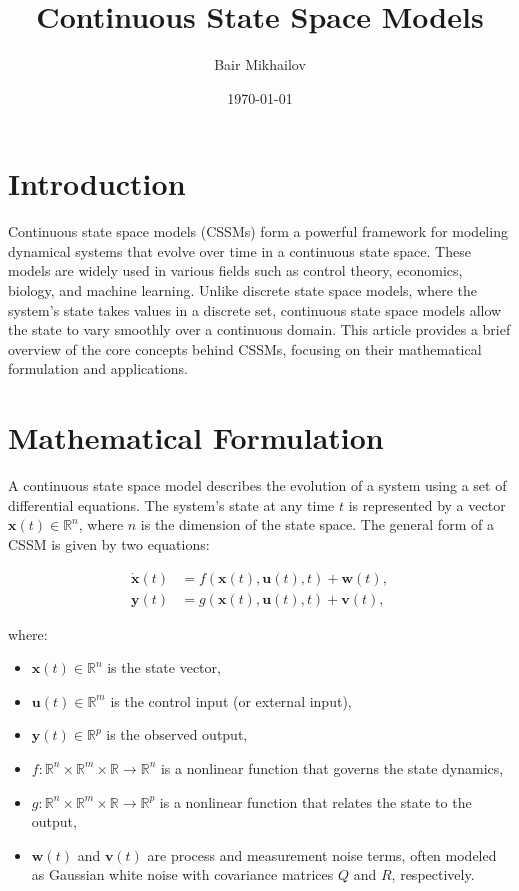 \documentclass[12pt]{article}
\title{Continuous State Space Models}
\author{Bair Mikhailov}
\date{\today}
\begin{document}
\maketitle

\section{Introduction}

Continuous state space models (CSSMs) form a powerful framework for modeling dynamical systems that evolve over time in a continuous state space. These models are widely used in various fields such as control theory, economics, biology, and machine learning. Unlike discrete state space models, where the system's state takes values in a discrete set, continuous state space models allow the state to vary smoothly over a continuous domain. This article provides a brief overview of the core concepts behind CSSMs, focusing on their mathematical formulation and applications.

\section{Mathematical Formulation}

A continuous state space model describes the evolution of a system using a set of differential equations. The system's state at any time \( t \) is represented by a vector \( \mathbf{x}(t) \in \mathbb{R}^n \), where \( n \) is the dimension of the state space. The general form of a CSSM is given by two equations:

\begin{align}
    \dot{\mathbf{x}}(t) &= f(\mathbf{x}(t), \mathbf{u}(t), t) + \mathbf{w}(t), \label{eq:state_equation}\\
    \mathbf{y}(t) &= g(\mathbf{x}(t), \mathbf{u}(t), t) + \mathbf{v}(t), \label{eq:output_equation}
\end{align}

where:
\begin{itemize}
    \item \( \mathbf{x}(t) \in \mathbb{R}^n \) is the state vector,
    \item \( \mathbf{u}(t) \in \mathbb{R}^m \) is the control input (or external input),
    \item \( \mathbf{y}(t) \in \mathbb{R}^p \) is the observed output,
    \item \( f: \mathbb{R}^n \times \mathbb{R}^m \times \mathbb{R} \rightarrow \mathbb{R}^n \) is a nonlinear function that governs the state dynamics,
    \item \( g: \mathbb{R}^n \times \mathbb{R}^m \times \mathbb{R} \rightarrow \mathbb{R}^p \) is a nonlinear function that relates the state to the output,
    \item \( \mathbf{w}(t) \) and \( \mathbf{v}(t) \) are process and measurement noise terms, often modeled as Gaussian white noise with covariance matrices \( Q \) and \( R \), respectively.
\end{itemize}
\end{document}
